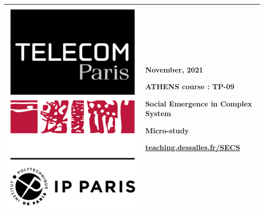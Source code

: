 \documentclass[12pt,a4paper]{article}
\begin{document}
\begin{center}
  \begin{tabular}{|p{}|p{}|}
    \hline
    {
    \vspace{0cm} %
    \centerline{\includegraphics[width=\linewidth]{tp-ipp}}
    }
    & {
      \vspace{0cm} %
      \centering
      \large
      {\hfill November, 2021}
      
      \vspace*{.5cm}
      ATHENS course : \textbf{TP-09}
      
      \vspace*{.5cm}
      {\LARGE\textbf{Social Emergence in Complex System}}
      
      \vspace*{.5cm}
      Micro-study

      \vspace*{1.5cm}
      \hfill\href{http://teaching.dessalles.fr/SECS}{\ttfamily teaching.dessalles.fr/SECS}
      }\\
    \hline
  \end{tabular}
\end{center}
\end{document}
